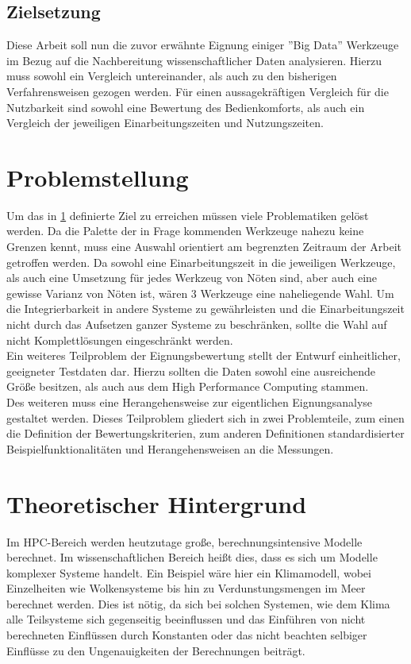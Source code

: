 \documentclass[
	12pt,
	a4paper,
	BCOR10mm,
	DIV14,
	listof=totoc,
	bibliography=totoc,
	headsepline
]{scrreprt}
\begin{document}
\section{Zielsetzung}
\label{ziel}
Diese Arbeit soll nun die zuvor erwähnte Eignung einiger ''Big Data'' Werkzeuge im Bezug auf die Nachbereitung wissenschaftlicher Daten analysieren.
Hierzu muss sowohl ein Vergleich untereinander, als auch zu den bisherigen Verfahrensweisen gezogen werden.
Für einen aussagekräftigen Vergleich für die Nutzbarkeit sind sowohl eine Bewertung des Bedienkomforts, als auch ein Vergleich der jeweiligen Einarbeitungszeiten und Nutzungszeiten.


\chapter{Problemstellung}
\label{Problemstellung}
Um das in \ref{ziel} definierte Ziel zu erreichen müssen viele Problematiken gelöst werden.
Da die Palette der in Frage kommenden Werkzeuge nahezu keine Grenzen kennt, muss eine Auswahl orientiert am begrenzten Zeitraum der Arbeit getroffen werden.
Da sowohl eine Einarbeitungszeit in die jeweiligen Werkzeuge, als auch eine Umsetzung für jedes Werkzeug von Nöten sind, aber auch eine gewisse Varianz von Nöten ist, wären 3 Werkzeuge eine naheliegende Wahl. 
Um die Integrierbarkeit in andere Systeme zu gewährleisten und die Einarbeitungszeit nicht durch das Aufsetzen ganzer Systeme zu beschränken, sollte die Wahl auf nicht Komplettlösungen eingeschränkt werden. \\
Ein weiteres Teilproblem der Eignungsbewertung stellt der Entwurf einheitlicher, geeigneter Testdaten dar.
Hierzu sollten die Daten sowohl eine ausreichende Größe besitzen, als auch aus dem High Performance Computing stammen. \\
Des weiteren muss eine Herangehensweise zur eigentlichen Eignungsanalyse gestaltet werden. 
Dieses Teilproblem gliedert sich in zwei Problemteile, zum einen die Definition der Bewertungskriterien, zum anderen Definitionen standardisierter Beispielfunktionalitäten und Herangehensweisen an die Messungen.


\chapter{Theoretischer Hintergrund}
\label{Theoretischer Hintergrund}
Im HPC-Bereich werden heutzutage große, berechnungsintensive Modelle berechnet. 
Im wissenschaftlichen Bereich heißt dies, dass es sich um Modelle komplexer Systeme handelt.
Ein Beispiel wäre hier ein Klimamodell, wobei Einzelheiten wie Wolkensysteme bis hin zu Verdunstungsmengen im Meer berechnet werden.
Dies ist nötig, da sich bei solchen Systemen, wie dem Klima alle Teilsysteme sich gegenseitig beeinflussen und das Einführen von nicht berechneten Einflüssen durch Konstanten oder das nicht beachten selbiger Einflüsse zu den Ungenauigkeiten der Berechnungen beiträgt. \\
 
\end{document}
